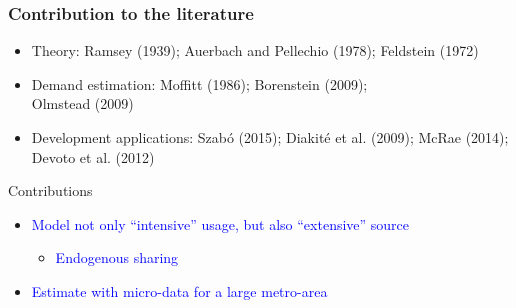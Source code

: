 \documentclass[aspectratio=149]{beamer}
\begin{document}
\begin{frame}
\frametitle{ Contribution to the literature}

\begin{itemize}
  \item \textcolor{navyblue}{Theory:} Ramsey (1939); Auerbach and Pellechio (1978); Feldstein (1972)
  \item \textcolor{navyblue}{Demand estimation:} Moffitt (1986); Borenstein (2009); \\ Olmstead (2009)
  \item \textcolor{navyblue}{Development applications:} Szab\'{o} (2015); Diakit\'{e} et al. (2009); McRae (2014); Devoto et al. (2012)
\end{itemize}
\vspace{.1cm}
Contributions
\vspace{.1cm}
\begin{itemize}
  \item \textcolor{blue}{Model not only ``intensive'' usage, but also ``extensive'' source} 
  \begin{itemize}
    \item \textcolor{blue}{Endogenous sharing}
  \end{itemize}
  \item \textcolor{blue}{Estimate with micro-data for a large metro-area}
  \end{itemize}
\end{frame}
\end{document}
